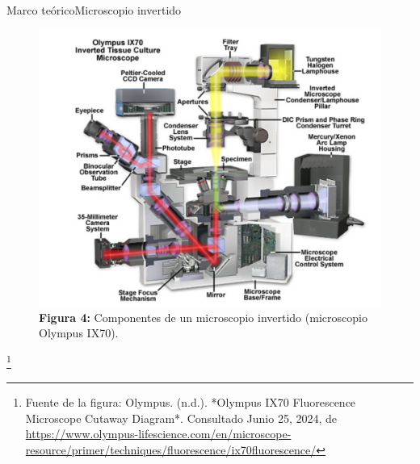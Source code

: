 \documentclass[10pt,aspectratio=1610,compress,dvipsnames]{beamer}
\newcommand\blfootnote[1]{%
  \begingroup
  \renewcommand\thefootnote{}\footnote{#1}%
  \addtocounter{footnote}{-1}%
  \endgroup
}
\begin{document}
\begin{frame}{Marco teórico}{Microscopio invertido}

\begin{figure}
    \centering
    \includegraphics[scale=0.3]{Microscopeinvertedtrain.png}
    \captionsetup{labelformat=empty}
    \caption{\textbf{Figura 4:} Componentes de un microscopio invertido (microscopio Olympus IX70).}
    \label{Microscope inverted}
\end{figure}
\blfootnote{\scriptsize Fuente de la figura: Olympus. (n.d.). *Olympus IX70 Fluorescence Microscope Cutaway Diagram*. Consultado Junio 25, 2024, de \url{https://www.olympus-lifescience.com/en/microscope-resource/primer/techniques/fluorescence/ix70fluorescence/}
}


\end{frame}
\end{document}
